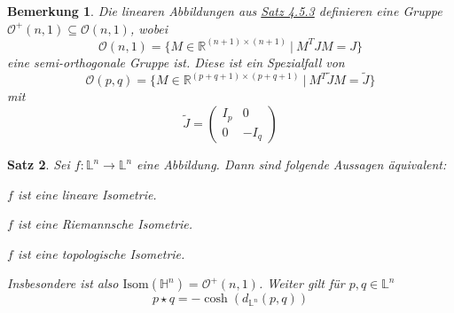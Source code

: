 \documentclass[11pt]{book}
\numberwithin{dummy}{section}
\newtheorem{theorem}{Satz}[section]
\newtheorem{remark}[theorem]{Bemerkung}
\theoremstyle{nonumberbreak}
\newcommand{\Loid}{\mathbb{L}}
\newcommand{\He}{\mathbb{H}}
\newcommand{\la}{\longrightarrow}
\begin{document}
\begin{spacing}{1.4}
\begin{remark}
Die linearen Abbildungen aus \hyperlink{vierfuenfdrei}{Satz 4.5.3} definieren eine Gruppe $\mathcal{O}^+(n,1) \subseteq \mathcal{O}(n,1)$, wobei
$$\mathcal{O}(n,1) = \{ M \in \mathbb{R}^{(n+1) \times (n+1)} \ \vert \ M^TJM = J\}$$
eine \textit{semi-orthogonale Gruppe} ist. Diese ist ein Spezialfall von 
$$\mathcal{O}(p,q) = \{ M \in \mathbb{R}^{(p+q+1) \times (p+q+1)} \ \vert \ M^T \tilde{J} M = \tilde{J} \}$$
mit 
$$\tilde{J} = \begin{pmatrix} I_p & 0 \\ 0 &-I_q \end{pmatrix}$$

\end{remark}


\begin{theorem}    %
Sei $f: \Loid^n \la \Loid^n$ eine Abbildung. Dann sind folgende Aussagen äquivalent:
\begin{compactenum}
\item $f$ ist eine lineare Isometrie.
\item $f$ ist eine Riemannsche Isometrie.
\item $f$ ist eine topologische Isometrie.
\end{compactenum}
Insbesondere ist also $\mathrm{Isom}(\He^n)=\mathcal{O}^+(n,1)$.
Weiter gilt für $p,q \in \Loid^n$
$$p \star q = - \cosh \left( d_{\Loid^n}(p,q)\right)$$



\end{theorem}
\end{spacing}
\end{document}
